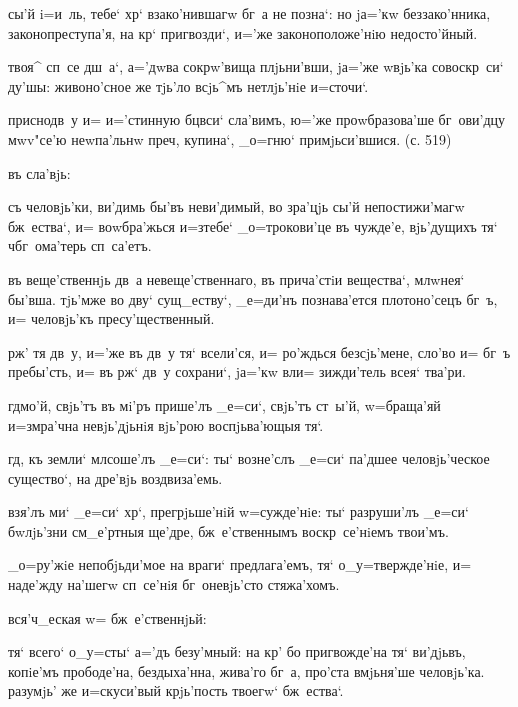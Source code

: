  сы'й i=и~ль, тебе` хр` 
взако'нившагw бг~а не позна`: но jа='кw беззако'нника, 
законопреступа'я, на кр` пригвозди`, и='же 
законоположе'нiю недосто'йный.

 твоя^ сп~се дш~а`, а='дwва сокрw'вища 
плjьни'вши, jа='же w\т вjь'ка совоскр~си` ду'шы: 
живоно'сное же тjь'ло всjь^мъ нетлjь'нiе и=сточи`.

  приснодв~у и= и='стинную 
бц вси` сла'вимъ, ю='же проwбразова'ше бг~ови'дцу 
мwv"се'ю неwпа'льнw преч, купина`, _о=гню` 
примjьси'вшися. (с. 519)

  въ сла'вjь:

 съ человjь'ки, ви'димь бы'въ неви'димый, 
во зра'цjь сы'й непостижи'магw бж~ества`, и= воwбра'жься 
и=з\ъ тебе` _о=трокови'це въ чужде'е, вjь'дущихъ тя` 
ч бг~ома'терь сп~са'етъ.

 въ веще'ственнjь дв~а невеще'ственнаго, въ 
прича'стiи вещества`, мл w\т нея` бы'вша. тjь'мже во 
дву` сущ_еству`, _е=ди'нъ познава'ется плотоно'сецъ бг~ъ, 
и= человjь'къ пресу'щественный.

 рж' тя дв~у, и='же въ дв~у тя` всели'ся, 
и= ро'ждься без\ъ сjь'мене, сло'во и= бг~ъ пребы'сть, и= 
въ рж` дв~у сохрани`, jа='кw вл и= зижди'тель 
всея` тва'ри.


  гд мо'й, свjь'тъ въ мi'ръ 
прише'лъ _е=си`, свjь'тъ ст~ы'й, w=браща'яй и=з\ъ мра'чна 
невjь'дjьнiя вjь'рою воспjьва'ющыя тя`.

 гд, къ земли` мл соше'лъ _е=си`: ты` 
возне'слъ _е=си` па'дшее человjь'ческое существо`, на 
дре'вjь воздвиза'емь.

 взя'лъ ми` _е=си` хр`, прегрjьше'нiй 
w=сужде'нiе: ты` разруши'лъ _е=си` бwлjь'зни см_е'ртныя 
ще'дре, бж~е'ственнымъ воскр~се'нiемъ твои'мъ.

  _о=ру'жiе непобjьди'мое на 
враги` предлага'емъ, тя` о_у=твержде'нiе, и= наде'жду 
на'шегw сп~се'нiя бг~оневjь'сто стяжа'хомъ.

   вся'ч_еская w= 
бж~е'ственнjьй:

 тя` всего` о_у=сты` а='дъ безу'мный: на 
кр' бо пригвожде'на тя` ви'дjьвъ, копiе'мъ 
прободе'на, бездыха'нна, жива'го бг~а, про'ста вмjьня'ше 
человjь'ка. разумjь' же и=скуси'вый крjь'пость твоегw` 
бж~ества`.

